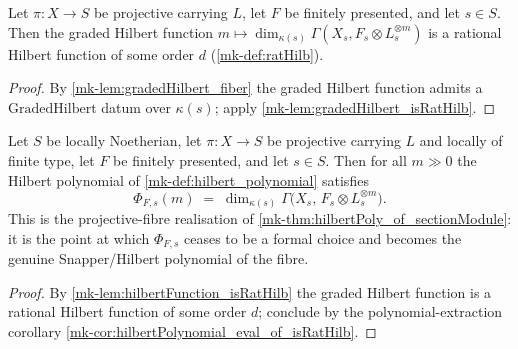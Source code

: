 \begin{lemma}
  \label{mk-lem:hilbertFunction_isRatHilb}
  \leanok

  Let \(\pi : X \to S\) be projective carrying \(L\), let \(F\) be finitely
  presented, and let \(s \in S\).  Then the graded Hilbert function
  \(m \mapsto \dim_{\kappa(s)} \Gamma(X_s, F_s \otimes L_s^{\otimes m})\) is a
  rational Hilbert function of some order \(d\) (\ref{mk-def:ratHilb}).
\end{lemma}

\begin{proof}
  By \ref{mk-lem:gradedHilbert_fiber} the graded Hilbert function admits a
  \(\mathrm{GradedHilbert}\) datum over \(\kappa(s)\); apply
  \ref{mk-lem:gradedHilbert_isRatHilb}.
\end{proof}

\begin{lemma}
  \label{mk-lem:hilbertPolynomial_eval_eventually_of_projective}
  \leanok

  Let \(S\) be locally Noetherian, let \(\pi : X \to S\) be projective carrying
  \(L\) and locally of finite type, let \(F\) be finitely presented, and let
  \(s \in S\).  Then for all \(m \gg 0\) the Hilbert polynomial of
  \ref{mk-def:hilbert_polynomial} satisfies
  \[
    \Phi_{F,s}(m) \;=\; \dim_{\kappa(s)}
      \Gamma\bigl(X_s,\, F_s \otimes L_s^{\otimes m}\bigr).
  \]
  This is the projective-fibre realisation of
  \ref{mk-thm:hilbertPoly_of_sectionModule}: it is the point at which
  \(\Phi_{F,s}\) ceases to be a formal choice and becomes the genuine
  Snapper/Hilbert polynomial of the fibre.
\end{lemma}

\begin{proof}
  By \ref{mk-lem:hilbertFunction_isRatHilb} the graded Hilbert function is a
  rational Hilbert function of some order \(d\); conclude by the
  polynomial-extraction corollary
  \ref{mk-cor:hilbertPolynomial_eval_of_isRatHilb}.
\end{proof}

